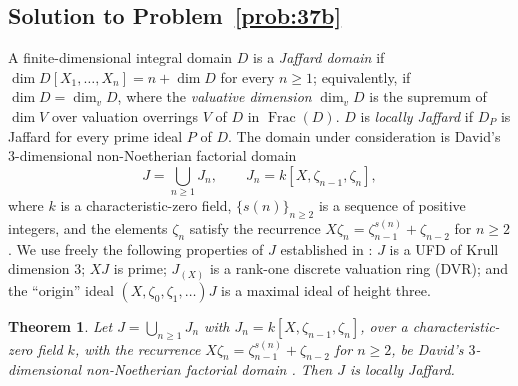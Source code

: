 \documentclass[11pt,reqno]{amsart}
\numberwithin{equation}{section}
\newtheorem{theorem}[thm]{Theorem}
\theoremstyle{definition}
\begin{document}
\subsection{Solution to Problem~\ref{prob:37b}}\label{subsec:proof-37b}

A finite-dimensional integral domain $D$ is a \emph{Jaffard domain} if
$\dim D[X_1,\dots,X_n]=n+\dim D$ for every $n\ge 1$; equivalently, if
$\dim D=\dim_v D$, where the \emph{valuative dimension} $\dim_v D$ is
the supremum of $\dim V$ over valuation overrings $V$ of $D$ in
$\operatorname{Frac}(D)$. $D$ is \emph{locally Jaffard} if $D_P$ is
Jaffard for every prime ideal $P$ of $D$. The domain under
consideration is David's $3$-dimensional non-Noetherian factorial
domain
\[
   J=\bigcup_{n\ge 1} J_n,\qquad J_n=k[X,\zeta_{n-1},\zeta_n],
\]
where $k$ is a characteristic-zero field, $\{s(n)\}_{n\ge 2}$ is a
sequence of positive integers, and the elements $\zeta_n$ satisfy the
recurrence $X\zeta_n=\zeta_{n-1}^{s(n)}+\zeta_{n-2}$ for $n\ge 2$. We
use freely the following properties of $J$ established in
\cite{David1973}: $J$ is a UFD of Krull dimension $3$; $XJ$ is prime;
$J_{(X)}$ is a rank-one discrete valuation ring (DVR); and the
``origin'' ideal $(X,\zeta_0,\zeta_1,\dots)J$ is a maximal ideal of
height three.

\begin{theorem}\label{thm:37b}
Let $J=\bigcup_{n\ge 1}J_n$ with $J_n=k[X,\zeta_{n-1},\zeta_n]$, over a
characteristic-zero field $k$, with the recurrence
$X\zeta_n=\zeta_{n-1}^{s(n)}+\zeta_{n-2}$ for $n\ge 2$, be David's
$3$-dimensional non-Noetherian factorial domain \cite{David1973}. Then
$J$ is locally Jaffard.
\end{theorem}
\end{document}
